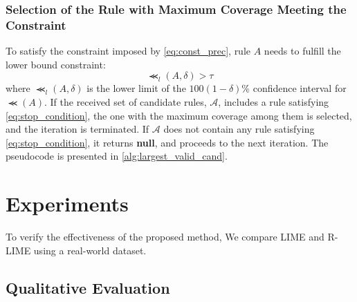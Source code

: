 \documentclass[runningheads]{llncs}
\begin{document}
\subsubsection{Selection of the Rule with Maximum Coverage Meeting the Constraint}
To satisfy the constraint imposed by \cref{eq:const_prec}, rule $A$ needs to fulfill the lower bound constraint:
\begin{equation}
  \Prec_{l}(A,\delta)>\tau
  \label{eq:stop_condition}
\end{equation}
where $\Prec_{l}(A,\delta)$ is the lower limit of
the $100(1-\delta)$\% confidence interval for $\Prec(A)$.
If the received set of candidate rules, $\mathcal{A}$,
includes a rule satisfying \cref{eq:stop_condition},
the one with the maximum coverage among them is selected,
and the iteration is terminated.
If $\mathcal{A}$ does not contain any rule satisfying \cref{eq:stop_condition},
it returns \textbf{null},
and proceeds to the next iteration.
The pseudocode is presented in \cref{alg:largest_valid_cand}.


\section{Experiments}
To verify the effectiveness of the proposed method,
We compare LIME and R-LIME using a real-world dataset.

\subsection{Qualitative Evaluation}
\end{document}
